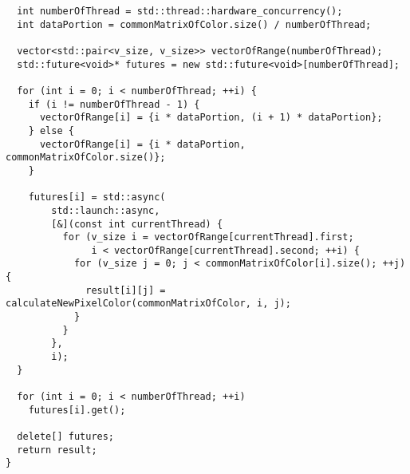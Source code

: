 \documentclass{report}
\begin{document}
\begin{lstlisting}
  int numberOfThread = std::thread::hardware_concurrency();
  int dataPortion = commonMatrixOfColor.size() / numberOfThread;

  vector<std::pair<v_size, v_size>> vectorOfRange(numberOfThread);
  std::future<void>* futures = new std::future<void>[numberOfThread];

  for (int i = 0; i < numberOfThread; ++i) {
    if (i != numberOfThread - 1) {
      vectorOfRange[i] = {i * dataPortion, (i + 1) * dataPortion};
    } else {
      vectorOfRange[i] = {i * dataPortion, commonMatrixOfColor.size()};
    }

    futures[i] = std::async(
        std::launch::async,
        [&](const int currentThread) {
          for (v_size i = vectorOfRange[currentThread].first;
               i < vectorOfRange[currentThread].second; ++i) {
            for (v_size j = 0; j < commonMatrixOfColor[i].size(); ++j) {
              result[i][j] = calculateNewPixelColor(commonMatrixOfColor, i, j);
            }
          }
        },
        i);
  }

  for (int i = 0; i < numberOfThread; ++i)
    futures[i].get();

  delete[] futures;
  return result;
}

	
	
	
\end{lstlisting}
\end{document}
